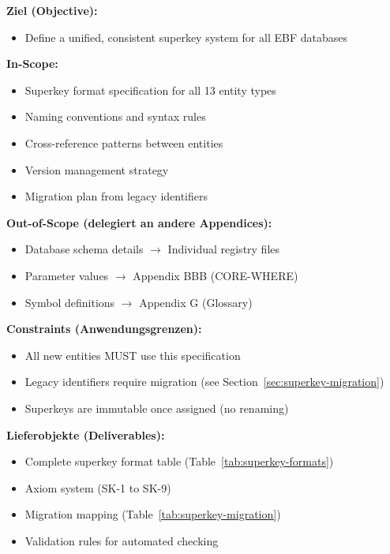 \begin{tcolorbox}[
    colback=orange!5!white,
    colframe=orange!75!black,
    title={\textbf{Appendix Scope: Ziel / In-Scope / Out-of-Scope / Constraints}},
    fonttitle=\bfseries
]

\textbf{Ziel (Objective):}
\begin{itemize}[nosep]
    \item Define a unified, consistent superkey system for all EBF databases
\end{itemize}

\textbf{In-Scope:}
\begin{itemize}[nosep]
    \item Superkey format specification for all 13 entity types
    \item Naming conventions and syntax rules
    \item Cross-reference patterns between entities
    \item Version management strategy
    \item Migration plan from legacy identifiers
\end{itemize}

\textbf{Out-of-Scope (delegiert an andere Appendices):}
\begin{itemize}[nosep]
    \item Database schema details $\rightarrow$ Individual registry files
    \item Parameter values $\rightarrow$ Appendix BBB (CORE-WHERE)
    \item Symbol definitions $\rightarrow$ Appendix G (Glossary)
\end{itemize}

\textbf{Constraints (Anwendungsgrenzen):}
\begin{itemize}[nosep]
    \item All new entities MUST use this specification
    \item Legacy identifiers require migration (see Section~\ref{sec:superkey-migration})
    \item Superkeys are immutable once assigned (no renaming)
\end{itemize}

\textbf{Lieferobjekte (Deliverables):}
\begin{itemize}[nosep]
    \item Complete superkey format table (Table~\ref{tab:superkey-formats})
    \item Axiom system (SK-1 to SK-9)
    \item Migration mapping (Table~\ref{tab:superkey-migration})
    \item Validation rules for automated checking
\end{itemize}

\end{tcolorbox}


